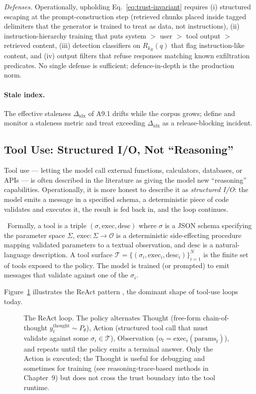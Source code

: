 \emph{Defenses.} Operationally, upholding
Eq.~\eqref{eq:trust-invariant} requires (i) structured escaping at
the prompt-construction step (retrieved chunks placed inside tagged
delimiters that the generator is trained to treat as data, not
instructions), (ii) instruction-hierarchy training
\citep{wallace2024instruction} that puts system $>$ user $>$ tool
output $>$ retrieved content, (iii) detection classifiers on
$R_{k_R}(q)$ that flag instruction-like content, and (iv) output
filters that refuse responses matching known exfiltration
predicates. No single defense is sufficient; defence-in-depth is
the production norm.

\paragraph{Stale index.} The effective staleness $\Delta_\mathrm{idx}$
of A9.1 drifts while the corpus grows; define and monitor a
staleness metric and treat exceeding $\Delta_\mathrm{idx}$ as a
release-blocking incident.

\subsection{Tool Use: Structured I/O, Not ``Reasoning''}

Tool use --- letting the model call external functions,
calculators, databases, or APIs --- is often described in the
literature as giving the model new ``reasoning'' capabilities.
Operationally, it is more honest to describe it as \emph{structured
I/O}: the model emits a message in a specified schema, a
deterministic piece of code validates and executes it, the result
is fed back in, and the loop continues.

\Def\ Formally, a tool is a triple $(\sigma, \mathrm{exec},
\mathrm{desc})$ where $\sigma$ is a JSON schema specifying the
parameter space $\Sigma$, $\mathrm{exec} : \Sigma \to \mathcal{O}$ is a
deterministic side-effecting procedure mapping validated
parameters to a textual observation, and $\mathrm{desc}$ is a
natural-language description. A tool surface $\mathcal{T} = \{(\sigma_i,
\mathrm{exec}_i, \mathrm{desc}_i)\}_{i=1}^{N}$ is the finite set of
tools exposed to the policy. The model is trained (or prompted) to
emit messages that validate against one of the $\sigma_i$.

Figure~\ref{fig:react-loop} illustrates the ReAct pattern
\citep{yao2023react}, the dominant shape of tool-use loops today.

\begin{figure}[ht]
  \centering
  
  \caption{The ReAct loop. The policy alternates Thought (free-form
  chain-of-thought $y_t^{\mathrm{thought}} \sim P_\theta$), Action
  (structured tool call that must validate against some
  $\sigma_i \in \mathcal{T}$), Observation ($o_t =
  \mathrm{exec}_i(\mathrm{params}_t)$), and repeats until the policy
  emits a terminal answer. Only the Action is executed; the
  Thought is useful for debugging and sometimes for training (see
  reasoning-trace-based methods in Chapter~9) but does not cross the
  trust boundary into the tool runtime.}
  \label{fig:react-loop}
\end{figure}

